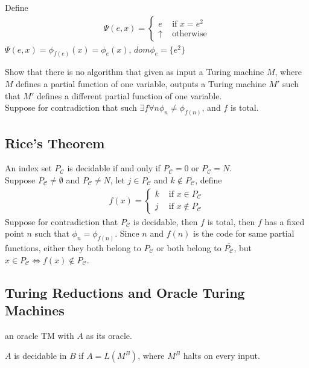  Define
\begin{align*}
  \Psi(e,x)=
  \begin{cases}
    e & \text{ if } x = e^2 \\
    \uparrow & \text{ otherwise}
  \end{cases}
\end{align*}
$\Psi(e,x)=\phi_{f(e)}(x)=\phi_e(x)$, $dom\phi_e = \{e^2\}$

 Show that there is no algorithm that given as input a Turing 
machine $M$, where $M$ defines a partial function of one variable, outputs
a Turing machine $M'$ such that $M'$ defines a different partial function of one
variable.\\
Suppose for contradiction that such $\exists f \forall n \phi_n \ne
\phi_{f(n)}$, and $f$ is total.


\subsection{Rice's Theorem}

 An index set $P_{\mathscr{C}}$ is decidable if and only if
$P_{\mathscr{C}} = 0$ or $P_{\mathscr{C}}= N$.\\
Suppose $P_{\mathscr{C}} \neq \emptyset$ and $P_{\mathscr{C}} \neq N$, let 
$j \in P_{\mathscr{C}}$ and $k \notin P_{\mathscr{C}}$, define
\begin{align*}
  f(x) = 
  \begin{cases}
    k & \text{ if } x \in P_{\mathscr{C}} \\
    j & \text{ if } x \notin P_{\mathscr{C}}
  \end{cases}
\end{align*}
Suppose for contradiction that $P_{\mathscr{C}}$ is decidable, then $f$ is
total, then $f$ has a fixed point $n$ such that $\phi_n = \phi_{f(n)}$. Since $n$
and $f(n)$ is the code for same partial functions, either they both belong to
$P_{\mathscr{C}}$ or both belong to $\overline{P_{\mathscr{C}}}$, but 
$x \in P_{\mathscr{C}} \Leftrightarrow f(x) \notin P_{\mathscr{C}}$.

\subsection{Turing Reductions and Oracle Turing Machines}

 an oracle TM with $A$ as its oracle.

 $A$ is decidable in $B$ if $A = L(M^B)$, where $M^B$ halts on
every input.

